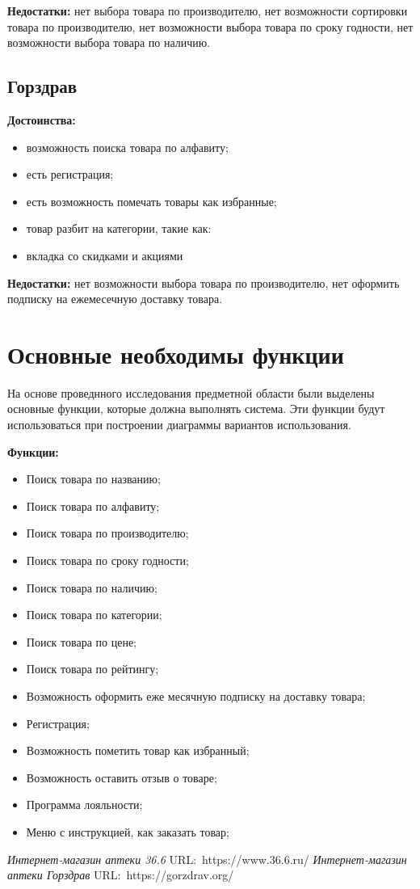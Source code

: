 \textbf{Недостатки:} нет выбора товара по производителю,
нет возможности сортировки товара по производителю,
нет возможности выбора товара по сроку годности,
нет возможности выбора товара по наличию.

\subsection{Горздрав}
\textbf{Достоинства:}\par
\begin{itemize}
	\item возможность поиска товара по алфавиту;
	\item есть регистрация;
	\item есть возможность помечать товары как избранные;
	\item товар разбит на категории, такие как:
	\item вкладка со скидками и акциями
\end{itemize}

\textbf{Недостатки:} нет возможности выбора товара по производителю,
нет оформить подписку на ежемесечную доставку товара.

\section{Основные необходимы функции}
На основе проведнного исследования предметной области были выделены основные
функции, которые должна выполнять система. Эти функции будут использоваться
при построении диаграммы вариантов использования.

\textbf{Функции:}
\begin{itemize}
	\item Поиск товара по названию;
	\item Поиск товара по алфавиту;
	\item Поиск товара по производителю;
	\item Поиск товара по сроку годности;
	\item Поиск товара по наличию;
	\item Поиск товара по категории;
	\item Поиск товара по цене;
	\item Поиск товара по рейтингу;
	\item Возможность оформить еже месячную подписку на доставку товара;
	\item Регистрация;
	\item Возможность пометить товар как избранный;
	\item Возможность оставить отзыв о товаре;
	\item Программа лояльности;
	\item Меню с инструкцией, как заказать товар;
\end{itemize}

\newpage
\begin{thebibliography}{0}
	 \textit{Интернет-магазин аптеки 36.6}
		URL:~https://www.36.6.ru/
	 \textit{Интернет-магазин аптеки Горздрав}
		URL:~https://gorzdrav.org/
\end{thebibliography}

